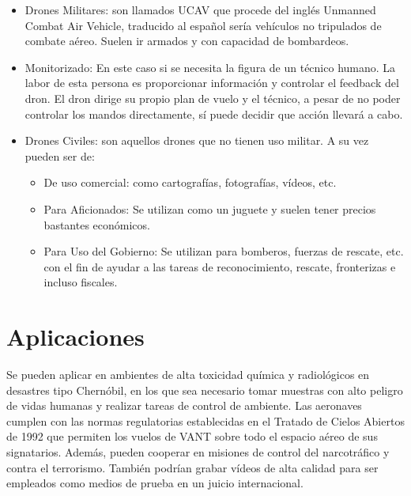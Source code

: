 \begin{itemize}
\item Drones Militares: son llamados UCAV que procede del inglés Unmanned Combat Air Vehicle, traducido al español sería vehículos no tripulados de combate aéreo. Suelen ir armados y con capacidad de bombardeos.
\item Monitorizado: En este caso si se necesita la figura de un técnico humano. La labor de esta persona es proporcionar información y controlar el feedback del dron. El dron dirige su propio plan de vuelo y el técnico, a pesar de no poder controlar los mandos directamente, sí puede decidir que acción llevará a cabo.
\item Drones Civiles: son aquellos drones que no tienen uso militar. A su vez pueden ser de: \begin{itemize}
\item De uso comercial: como cartografías, fotografías, vídeos, etc.
\item Para Aficionados: Se utilizan como un juguete y suelen tener precios bastantes económicos.
\item Para Uso del Gobierno: Se utilizan para bomberos, fuerzas de rescate, etc. con el fin de ayudar a las tareas de reconocimiento, rescate, fronterizas e incluso fiscales.
\end{itemize}
\end{itemize}

\section{Aplicaciones}
\label{sec:aplicaciones}

Se pueden aplicar en ambientes de alta toxicidad química y radiológicos en desastres tipo Chernóbil, en los que sea necesario tomar muestras con alto peligro de vidas humanas y realizar tareas de control de ambiente. Las aeronaves cumplen con las normas regulatorias establecidas en el Tratado de Cielos Abiertos de 1992 que permiten los vuelos de VANT sobre todo el espacio aéreo de sus signatarios. Además, pueden cooperar en misiones de control del narcotráfico y contra el terrorismo. También podrían grabar vídeos de alta calidad para ser empleados como medios de prueba en un juicio internacional.

